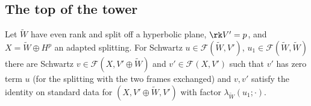 \subsection{The top of the tower}

\begin{proposition}\label{det-exchange:prop:top}
Let $\widetilde W$ have even rank and split off a hyperbolic plane, $\rk V'=p$, and $X=\widetilde W\oplus H^p$ an
adapted splitting. For Schwartz $u\in\mathcal F(\widetilde W,V')$, $u_1\in\mathcal F(\widetilde W,\widetilde W)$ there are
Schwartz $v\in\mathcal F(X,V'\oplus \widetilde W)$ and $v'\in\mathcal F(X,V')$ such that $v'$ has zero term
$u$ (for the splitting with the two frames exchanged) and $v,v'$ satisfy the identity on standard
data for $(X,V'\oplus \widetilde W,V')$ with factor $\lambda_{\widetilde W}(u_1;\cdot)$.
\end{proposition}


